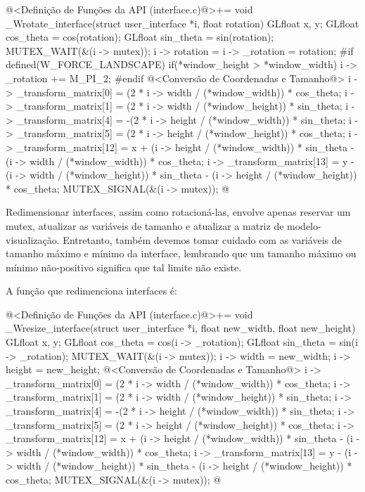 \iniciocodigo
@<Definição de Funções da API (interface.c)@>+=
void _Wrotate_interface(struct user_interface *i, float rotation){
  GLfloat x, y;
  GLfloat cos_theta = cos(rotation);
  GLfloat sin_theta = sin(rotation);
  MUTEX_WAIT(&(i -> mutex));
  i -> rotation = i -> _rotation = rotation;
#if defined(W_FORCE_LANDSCAPE)
  if(*window_height > *window_width)
    i -> _rotation += M_PI_2;
#endif 
  @<Conversão de Coordenadas e Tamanho@>
  i -> _transform_matrix[0] = (2 * i -> width / (*window_width)) *
    cos_theta;
  i -> _transform_matrix[1] = (2 * i -> width / (*window_height)) *
    sin_theta;
  i -> _transform_matrix[4] = -(2 * i -> height / (*window_width)) *
     sin_theta;
  i -> _transform_matrix[5] = (2 * i -> height / (*window_height)) *
    cos_theta;
  i -> _transform_matrix[12] = x +
    (i -> height / (*window_width)) * sin_theta -
    (i -> width / (*window_width)) * cos_theta;
  i -> _transform_matrix[13] = y -
    (i -> width / (*window_height)) * sin_theta -
    (i -> height / (*window_height)) * cos_theta;
  MUTEX_SIGNAL(&(i -> mutex));
}
@
\fimcodigo


Redimensionar interfaces, assim como rotacioná-las, envolve apenas
reservar um mutex, atualizar as variáveis de tamanho e atualizar a
matriz de modelo-visualização. Entretanto, também devemos tomar
cuidado com as variáveis de tamanho máximo e mínimo da interface,
lembrando que um tamanho máximo ou mínimo não-positivo significa que
tal limite não existe.

A função que redimenciona interfaces é:

\iniciocodigo
@<Definição de Funções da API (interface.c)@>+=
void _Wresize_interface(struct user_interface *i,
                        float new_width, float new_height){
  GLfloat x, y;
  GLfloat cos_theta = cos(i -> _rotation);
  GLfloat sin_theta = sin(i -> _rotation);
  MUTEX_WAIT(&(i -> mutex));
  i -> width = new_width;
  i -> height = new_height;
  @<Conversão de Coordenadas e Tamanho@>
  i -> _transform_matrix[0] = (2 * i -> width / (*window_width)) *
    cos_theta;
  i -> _transform_matrix[1] = (2 * i -> width / (*window_height)) *
    sin_theta;
  i -> _transform_matrix[4] = -(2 * i -> height / (*window_width)) *
     sin_theta;
  i -> _transform_matrix[5] = (2 * i -> height / (*window_height)) *
    cos_theta;
  i -> _transform_matrix[12] = x +
    (i -> height / (*window_width)) * sin_theta -
    (i -> width / (*window_width)) * cos_theta;
  i -> _transform_matrix[13] = y -
    (i -> width / (*window_height)) * sin_theta -
    (i -> height / (*window_height)) * cos_theta;
  MUTEX_SIGNAL(&(i -> mutex));
}
@
\fimcodigo

